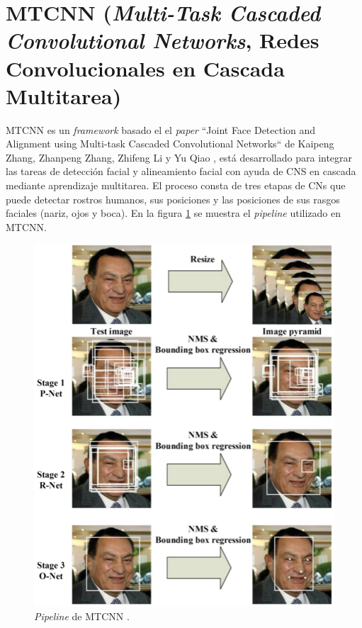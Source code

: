 \section{MTCNN (\textit{Multi-Task Cascaded Convolutional Networks}, Redes Convolucionales en Cascada Multitarea)}
MTCNN es un \textit{framework} basado el el \textit{paper} ``Joint Face Detection and Alignment using Multi-task Cascaded Convolutional Networks`` de Kaipeng Zhang, Zhanpeng Zhang, Zhifeng Li y Yu Qiao \cite{mtcnn_info}, está desarrollado para integrar las tareas de detección facial y alineamiento facial con ayuda de CNS en cascada mediante aprendizaje multitarea. El proceso consta de tres etapas de CNs que puede detectar rostros humanos, sus posiciones y las posiciones de sus rasgos faciales (nariz, ojos y boca). En la figura \ref{fig:mtcnn_pipe} se muestra el \textit{pipeline} utilizado en MTCNN.

\begin{figure}[h]
	\centering
	\includegraphics[scale=0.5]{./Figures/mtcnn_pipe.png}
	\caption{\textit{Pipeline} de MTCNN \cite{mtcnn_info}.}
	\label{fig:mtcnn_pipe}
\end{figure}


